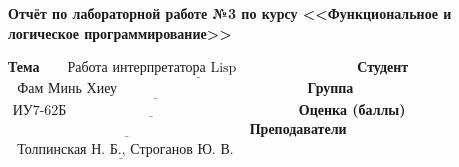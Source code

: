 \begin{titlepage}
	
	\begin{center}
		\Large\textbf{Отчёт по лабораторной работе №3 по курсу <<Функциональное и логическое программирование>>}
	\end{center}
	
	\bigskip\bigskip
	
	\noindent\textbf{Тема} $\underline{\text{~~~~~Работа интерпретатора Lisp~~~~~~~~~~~~~~~~~~~~~~~~~}}$\newline\newline\newline
	\noindent\textbf{Студент} $\underline{\text{~~Фам Минь Хиеу~~~~~~~~~~~~~~~~~~~~~~~~~~~~~~~~~~~~~~~~}}$\newline\newline
	\noindent\textbf{Группа} $\underline{\text{~ИУ7-62Б~~~~~~~~~~~~~~~~~~~~~~~~~~~~~~~~~~~~~~~~~~~~~~~~~}}$\newline\newline
	\noindent\textbf{Оценка (баллы)} $\underline{\text{~~~~~~~~~~~~~~~~~~~~~~~~~~~~~~~~~~~~~~~~~~~~~~~~~~~}}$\newline\newline
	\noindent\textbf{Преподаватели} $\underline{\text{~~Толпинская~Н.~Б., Строганов~Ю.~В.}}$\newline

 \restoregeometry
\end{titlepage}
